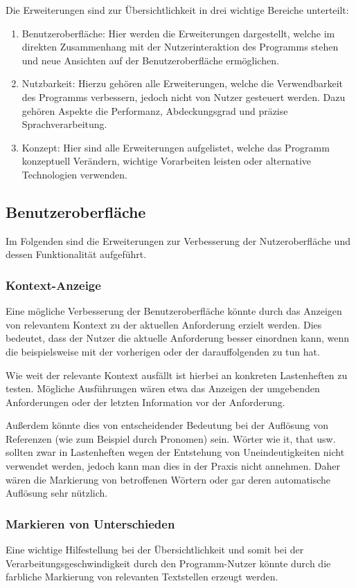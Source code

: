 \documentclass[12pt]{report}
\begin{document}
Die Erweiterungen sind zur Übersichtlichkeit in drei wichtige Bereiche unterteilt:
\begin{enumerate}
\item Benutzeroberfläche: Hier werden die Erweiterungen dargestellt, welche im direkten Zusammenhang mit der Nutzerinteraktion des Programms stehen und neue Ansichten auf der Benutzeroberfläche ermöglichen. 
\item Nutzbarkeit: Hierzu gehören alle Erweiterungen, welche die Verwendbarkeit des Programms verbessern, jedoch nicht von Nutzer gesteuert werden. Dazu gehören Aspekte die Performanz, Abdeckungsgrad und präzise Sprachverarbeitung.
\item Konzept: Hier sind alle Erweiterungen aufgelistet, welche das Programm konzeptuell Verändern, wichtige Vorarbeiten leisten oder alternative Technologien verwenden.  
\end{enumerate}

\subsection{Benutzeroberfläche}
Im Folgenden sind die Erweiterungen zur Verbesserung der Nutzeroberfläche und dessen Funktionalität aufgeführt. 

\subsubsection{Kontext-Anzeige}
Eine mögliche Verbesserung der Benutzeroberfläche könnte durch das Anzeigen von relevantem Kontext zu der aktuellen Anforderung erzielt werden. Dies bedeutet, dass der Nutzer die aktuelle Anforderung besser einordnen kann, wenn die beispielsweise mit der vorherigen oder der darauffolgenden zu tun hat. 

Wie weit der relevante Kontext ausfällt ist hierbei an konkreten Lastenheften zu testen. Mögliche Ausführungen wären etwa das Anzeigen der umgebenden Anforderungen oder der letzten Information vor der Anforderung.  

Außerdem könnte dies von entscheidender Bedeutung bei der Auflösung von Referenzen (wie zum Beispiel durch Pronomen) sein. Wörter wie \glqq it\grqq{}, \glqq that\grqq{} usw. sollten zwar in Lastenheften wegen der Entstehung von Uneindeutigkeiten nicht verwendet werden, jedoch kann man dies in der Praxis nicht annehmen. Daher wären die Markierung von betroffenen Wörtern oder gar deren automatische Auflösung sehr nützlich.

\subsubsection{Markieren von Unterschieden}
Eine wichtige Hilfestellung bei der Übersichtlichkeit und somit bei der Verarbeitungsgeschwindigkeit durch den Programm-Nutzer könnte durch die farbliche Markierung von relevanten Textstellen erzeugt werden.
 
\end{document}
